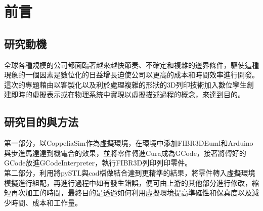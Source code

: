 \chapter{前言}
\renewcommand{\baselinestretch}{10.0} %
\setcounter{page}{1}  %
\fontsize{14pt}{2.5pt}\sectionef
\section{研究動機}
全球各種規模的公司都面臨著越來越快節奏、不確定和複雜的邊界條件，驅使這種現象的一個因素是數位化的日益增長迫使公司以更高的成本和時間效率進行開發。這次的專題藉由以客製化以及利於處理複雜的形狀的3D列印技術加入數位孿生創建即時的虛擬表示或在物理系統中實現以虛擬描述過程的概念，來達到目的。\\

\section{研究目的與方法}
第一部分，以CoppeliaSim作為虛擬環境，在環境中添加FIBR3DEuml和Arduino與步進馬達達到機電合的效果，並將零件轉進Cura成為GCode，接著將轉好的GCode放進GCodeInterpreter，執行FIBR3D列印列印零件。\\

第二部分，利用將pySTL與cad檔做結合達到更精準的結果，將零件轉入虛擬環境模擬進行組配，再進行過程中如有發生錯誤，便可由上游的其他部分進行修改，縮短再次加工的時間，最終目的是透過如何利用虛擬環境提高準確性和保真度以及減少時間、成本和工作量。\\

\renewcommand{\baselinestretch}{0.5} %